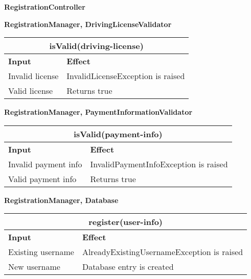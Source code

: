 \begin{Large}
\textbf{RegistrationController}
\end{Large}

\textbf{RegistrationManager, DrivingLicenseValidator} \\
\begin{tabular}{|p{5cm}|p{7cm}|}
\hline
\multicolumn{2}{|c|}{isValid(driving-license)} \\
\hline
\textbf{Input} & \textbf{Effect} \\

\hline
Invalid license & InvalidLicenseException is raised \\

\hline
Valid license & Returns true \\
\hline
\end{tabular}

\textbf{RegistrationManager, PaymentInformationValidator} \\
\begin{tabular}{|p{5cm}|p{7cm}|}
\hline
\multicolumn{2}{|c|}{isValid(payment-info)} \\
\hline
\textbf{Input} & \textbf{Effect} \\

\hline
Invalid payment info & InvalidPaymentInfoException is raised \\

\hline
Valid payment info & Returns true \\
\hline
\end{tabular}

\textbf{RegistrationManager, Database} \\
\begin{tabular}{|p{5cm}|p{7cm}|}
\hline
\multicolumn{2}{|c|}{register(user-info)} \\
\hline
\textbf{Input} & \textbf{Effect} \\

\hline
Existing username & AlreadyExistingUsernameException is raised \\

\hline
New username & Database entry is created \\
\hline
\end{tabular}
